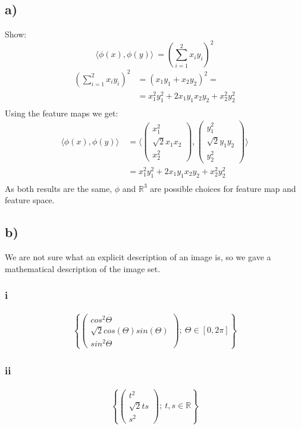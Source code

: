 \documentclass{article}
\newcommand{\R}[0]{\mathbb{R}}
\begin{document}
\subsection*{a)}
Show:
\begin{equation}
    \langle{}\phi(x), \phi(y)\rangle{}~= \left(\sum_{i=1}^2 x_i y_i \right)^2
\end{equation}
\begin{align}
    \left(\sum_{i=1}^2 x_i y_i \right)^2 &= \left(x_1 y_1 + x_2 y_2 \right)^2 = \\
    & = x_1^2 y_1^2 + 2 x_1 y_1 x_2 y_2 + x_2^2 y_2^2  \\
\end{align}
Using the feature maps we get:
\begin{align}
    \langle{}\phi(x), \phi(y)\rangle{}~ &= \langle{}
        \begin{pmatrix}x_1^2 \\ \sqrt{2} x_1 x_2 \\ x_2^2 \end{pmatrix},
        \begin{pmatrix}y_1^2 \\ \sqrt{2} y_1 y_2 \\ y_2^2 \end{pmatrix} \rangle{} \\
    & = x_1^2 y_1^2 + 2 x_1 y_1 x_2 y_2 + x_2^2 y_2^2  \\
\end{align}
As both results are the same, $\phi$ and $\R^3$ are possible choices for feature map
and feature space.

\subsection*{b)}
We are not sure what an explicit description of an image is, so we gave a mathematical description of the image set. 
\subsubsection*{i}
\begin{gather*}
\left\{ \left( \begin{array}{c}cos^2 \Theta \\ \sqrt{2} cos(\Theta) sin(\Theta) \\ sin^2 \Theta \end{array} \right); \ \Theta \in [0, 2\pi] \right\}
\end{gather*}
\subsubsection*{ii}
\begin{gather*}
\left\{ \left( \begin{array}{c}t^2 \\ \sqrt{2} t s \\ s^2 \end{array} \right); \ t,s \in \R \right\} 
\end{gather*}
\end{document}

